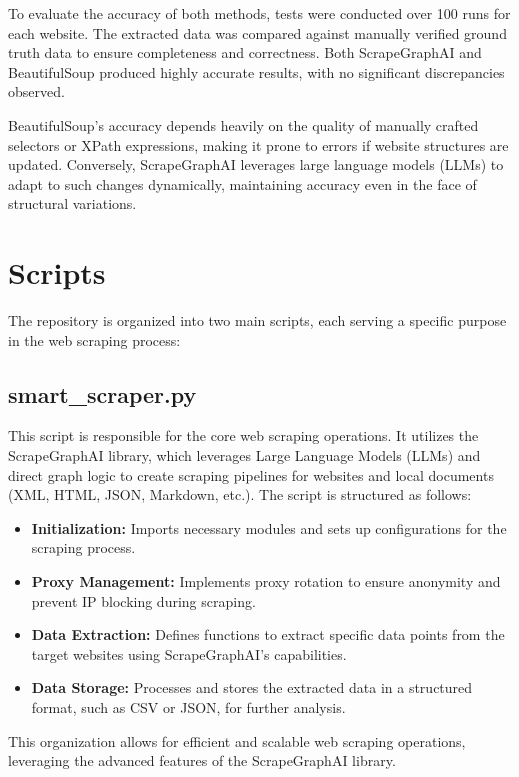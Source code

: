 To evaluate the accuracy of both methods, tests were conducted over 100 runs for each website. The extracted data was compared against manually verified ground truth data to ensure completeness and correctness. Both ScrapeGraphAI and BeautifulSoup produced highly accurate results, with no significant discrepancies observed.

BeautifulSoup's accuracy depends heavily on the quality of manually crafted selectors or XPath expressions, making it prone to errors if website structures are updated. Conversely, ScrapeGraphAI leverages large language models (LLMs) to adapt to such changes dynamically, maintaining accuracy even in the face of structural variations.


\section{Scripts}

The repository is organized into two main scripts, each serving a specific purpose in the web scraping process:

\subsection{smart\_scraper.py}

This script is responsible for the core web scraping operations. It utilizes the ScrapeGraphAI library, which leverages Large Language Models (LLMs) and direct graph logic to create scraping pipelines for websites and local documents (XML, HTML, JSON, Markdown, etc.). The script is structured as follows:

\begin{itemize}
    \item \textbf{Initialization:} Imports necessary modules and sets up configurations for the scraping process.
    \item \textbf{Proxy Management:} Implements proxy rotation to ensure anonymity and prevent IP blocking during scraping.
    \item \textbf{Data Extraction:} Defines functions to extract specific data points from the target websites using ScrapeGraphAI's capabilities.
    \item \textbf{Data Storage:} Processes and stores the extracted data in a structured format, such as CSV or JSON, for further analysis.
\end{itemize}

This organization allows for efficient and scalable web scraping operations, leveraging the advanced features of the ScrapeGraphAI library.

